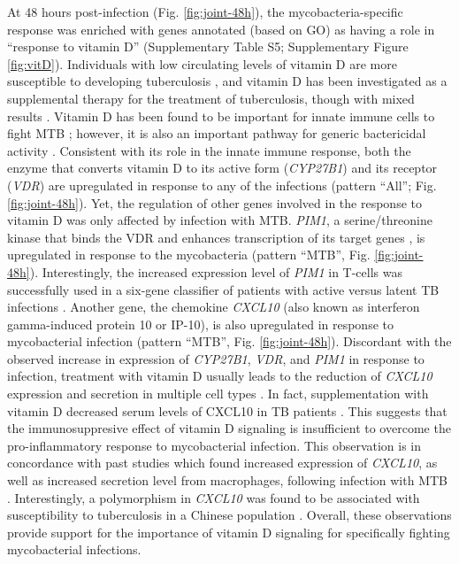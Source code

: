 At 48 hours post-infection (Fig. \ref{fig:joint-48h}), the mycobacteria-specific
response was enriched with genes annotated (based on GO) as having a
role in ``response to vitamin D'' (Supplementary Table S5; Supplementary
Figure \ref{fig:vitD}). Individuals with low circulating levels of vitamin D are
more susceptible to developing tuberculosis \citep{Zodpey2007,
Nnoaham2008}, and vitamin D has been investigated as a supplemental
therapy for the treatment of tuberculosis, though with mixed results
\citep{Martineau2007, Lucas2014, Xia2014, Kearns2015}. Vitamin D has
been found to be important for innate immune cells to fight MTB
\citep{Liu2006, Verway2013, Xu2014}; however, it is also an important
pathway for generic bactericidal activity \citep{Hewison2011}. Consistent
with its role in the innate immune response, both the enzyme that
converts vitamin D to its active form (\emph{CYP27B1}) and its receptor
(\emph{VDR}) are upregulated in response to any of the infections
(pattern ``All''; Fig. \ref{fig:joint-48h}). Yet, the regulation of other genes involved
in the response to vitamin D was only affected by infection with MTB.
\emph{PIM1}, a serine/threonine kinase that binds the VDR and enhances
transcription of its target genes \citep{Maier2012}, is upregulated in
response to the mycobacteria (pattern ``MTB'', Fig. \ref{fig:joint-48h}). Interestingly,
the increased expression level of \emph{PIM1} in T-cells was
successfully used in a six-gene classifier of patients with active
versus latent TB infections \citep{Jacobsen2011}. Another gene, the
chemokine \emph{CXCL10} (also known as interferon gamma-induced protein
10 or IP-10), is also upregulated in response to mycobacterial infection
(pattern ``MTB'', Fig. \ref{fig:joint-48h}). Discordant with the observed increase in
expression of \emph{CYP27B1}, \emph{VDR}, and \emph{PIM1} in response to
infection, treatment with vitamin D usually leads to the reduction of
\emph{CXCL10} expression and secretion in multiple cell types
\citep{Gysemans2005, Adorini2005, Scolletta2013}. In fact,
supplementation with vitamin D decreased serum levels of CXCL10 in TB
patients \citep{Coussens2012}. This suggests that the immunosuppresive
effect of vitamin D signaling is insufficient to overcome the
pro-inflammatory response to mycobacterial infection. This observation
is in concordance with past studies which found increased expression of
\emph{CXCL10}, as well as increased secretion level from macrophages,
following infection with MTB \citep{Zhu2006, Verway2013}. Interestingly,
a polymorphism in \emph{CXCL10} was found to be associated with
susceptibility to tuberculosis in a Chinese population \citep{Tang2009,
Azad2012}. Overall, these observations provide support for the
importance of vitamin D signaling for specifically fighting
mycobacterial infections.

